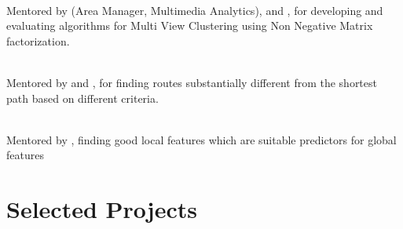 \documentclass[a4paper]{norm-resume}
\begin{document}
\vspace{-3mm} %

	\begin{changemargin}{0.7cm}{0.0cm} 
	{
	\large{}  \\
	\small{Mentored by  (Area Manager, Multimedia Analytics),  and , for developing and evaluating algorithms for Multi View Clustering using Non Negative Matrix factorization.}
	}
	\end{changemargin} 	

\vspace{-1mm} %
		
				
	
\vspace{-3mm} %

	\begin{changemargin}{0.7cm}{0.0cm} 
	{
	\large{}  \\
	\small{Mentored by  and , for finding routes substantially different from the shortest path based on different criteria.} 
	
\vspace{-1mm} %
			
	\large{} \\
	\small{Mentored by , finding good local features which are suitable predictors for global features}

	}
	\end{changemargin} 	

\vspace{-2mm}	%


\section{Selected Projects \hrulefill}

\vspace{1mm} %
\end{document}
